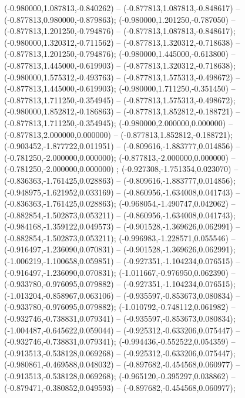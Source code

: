  (-0.980000,1.087813,-0.840262) -- (-0.877813,1.087813,-0.848617) -- (-0.877813,0.980000,-0.879863);
 (-0.980000,1.201250,-0.787050) -- (-0.877813,1.201250,-0.794876) -- (-0.877813,1.087813,-0.848617);
 (-0.980000,1.320312,-0.711562) -- (-0.877813,1.320312,-0.718638) -- (-0.877813,1.201250,-0.794876);
 (-0.980000,1.445000,-0.613800) -- (-0.877813,1.445000,-0.619903) -- (-0.877813,1.320312,-0.718638);
 (-0.980000,1.575312,-0.493763) -- (-0.877813,1.575313,-0.498672) -- (-0.877813,1.445000,-0.619903);
 (-0.980000,1.711250,-0.351450) -- (-0.877813,1.711250,-0.354945) -- (-0.877813,1.575313,-0.498672);
 (-0.980000,1.852812,-0.186863) -- (-0.877813,1.852812,-0.188721) -- (-0.877813,1.711250,-0.354945);
 (-0.980000,2.000000,0.000000) -- (-0.877813,2.000000,0.000000) -- (-0.877813,1.852812,-0.188721);
 (-0.903452,-1.877722,0.011951) -- (-0.809616,-1.883777,0.014856) -- (-0.781250,-2.000000,0.000000);
 (-0.877813,-2.000000,0.000000) -- (-0.781250,-2.000000,0.000000) ;
 (-0.927308,-1.751354,0.023070) -- (-0.836363,-1.761425,0.028863) -- (-0.809616,-1.883777,0.014856);
 (-0.948975,-1.621952,0.033169) -- (-0.860956,-1.634008,0.041743) -- (-0.836363,-1.761425,0.028863);
 (-0.968054,-1.490747,0.042062) -- (-0.882854,-1.502873,0.053211) -- (-0.860956,-1.634008,0.041743);
 (-0.984168,-1.359122,0.049573) -- (-0.901528,-1.369626,0.062991) -- (-0.882854,-1.502873,0.053211);
 (-0.996983,-1.228571,0.055546) -- (-0.916497,-1.236090,0.070831) -- (-0.901528,-1.369626,0.062991);
 (-1.006219,-1.100658,0.059851) -- (-0.927351,-1.104234,0.076515) -- (-0.916497,-1.236090,0.070831);
 (-1.011667,-0.976950,0.062390) -- (-0.933780,-0.976095,0.079882) -- (-0.927351,-1.104234,0.076515);
 (-1.013204,-0.858967,0.063106) -- (-0.935597,-0.853673,0.080834) -- (-0.933780,-0.976095,0.079882);
 (-1.010792,-0.748112,0.061982) -- (-0.932746,-0.738831,0.079341) -- (-0.935597,-0.853673,0.080834);
 (-1.004487,-0.645622,0.059044) -- (-0.925312,-0.633206,0.075447) -- (-0.932746,-0.738831,0.079341);
 (-0.994436,-0.552522,0.054359) -- (-0.913513,-0.538128,0.069268) -- (-0.925312,-0.633206,0.075447);
 (-0.980861,-0.469588,0.048032) -- (-0.897682,-0.454568,0.060977) -- (-0.913513,-0.538128,0.069268);
 (-0.965120,-0.395297,0.038862) -- (-0.879471,-0.380852,0.049593) -- (-0.897682,-0.454568,0.060977);
